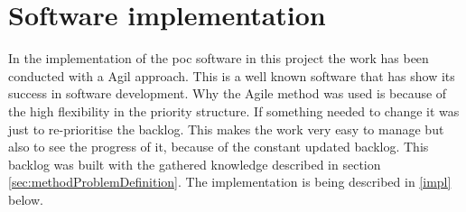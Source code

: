 \section{Software implementation}\label{sec:methodSoftwareImplementation}
In the implementation of the \acrshort{poc} software in this project the work has been conducted with a Agil approach. 
This is a well known software that has show its success in software development. \cite{DoesAgileWork2015}
Why the Agile method was used is because of the high flexibility in the priority structure.
If something needed to change it was just to re-prioritise the backlog.
This makes the work very easy to manage but also to see the progress of it, because of the constant updated backlog.
This backlog was built with the gathered knowledge described in section \cref{sec:methodProblemDefinition}.
The implementation is being described in \cref{impl} below.

\bigskip

